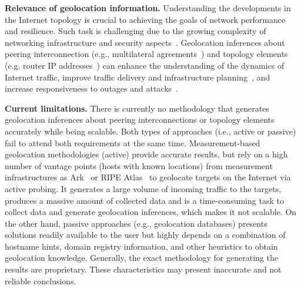	\textbf{Relevance of geolocation information.} Understanding the developments in the Internet topology is crucial to achieving the goals of network performance and resilience. Such task is challenging due to the growing complexity of networking infrastructure and security aspects~\cite{Giotsas:2015:MPI:2716281.2836122}. Geolocation inferences about peering interconnection (e.g., multilateral agreements~\cite{Giotsas:2013}) and topology elements (e.g. router IP addresses~\cite{8002903,Huffaker:2014:DDR:2656877.2656879}) can enhance the understanding of the dynamics of Internet traffic, improve traffic delivery and infrastructure planning~\cite{Calder:2013:MEG:2504730.2504754}, and increase responsiveness to outages and attacks~\cite{Giotsas:2017:DPI:3098822.3098855, marcos:2018:dynamix}. 


	\textbf{Current limitations.} There is currently no methodology that generates geolocation inferences about peering interconnections or topology elements accurately while being scalable. Both types of approaches (i.e., active or passive) fail to attend both requirements at the same time.  Measurement-based geolocation methodologies (active) provide accurate results, but rely on a high number of vantage points (hosts with known locations) from measurement infrastructures as Ark~\cite{ark} or RIPE Atlas~\cite{ripeatlas} to geolocate targets on the Internet via active probing. It generates a large volume of incoming traffic to the targets, produces a massive amount of collected data and is a time-consuming task to collect data and generate geolocation inferences, which makes it not scalable.  On the other hand, passive approaches (e.g., geolocation databases) presents solutions readily available to the user but highly depends on a combination of hostname hints, domain registry information, and other heuristics to obtain geolocation knowledge. Generally, the exact methodology for generating the results are proprietary. These characteristics may present inaccurate and not reliable conclusions.

